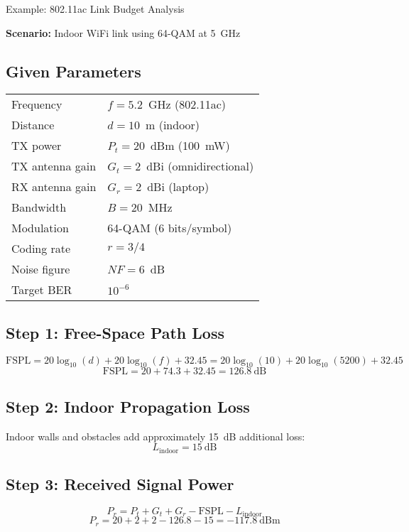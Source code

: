 \begin{calloutbox}{Example: 802.11ac Link Budget Analysis}

\textbf{Scenario:} Indoor WiFi link using 64-QAM at 5~GHz

\subsection*{Given Parameters}
\begin{tabular}{@{}ll@{}}
Frequency & $f = 5.2$~GHz (802.11ac) \\
Distance & $d = 10$~m (indoor) \\
TX power & $P_t = 20$~dBm (100~mW) \\
TX antenna gain & $G_t = 2$~dBi (omnidirectional) \\
RX antenna gain & $G_r = 2$~dBi (laptop) \\
Bandwidth & $B = 20$~MHz \\
Modulation & 64-QAM (6 bits/symbol) \\
Coding rate & $r = 3/4$ \\
Noise figure & $NF = 6$~dB \\
Target BER & $10^{-6}$ \\
\end{tabular}

\subsection*{Step 1: Free-Space Path Loss}
\begin{equation*}
\mathrm{FSPL} = 20\log_{10}(d) + 20\log_{10}(f) + 32.45 = 20\log_{10}(10) + 20\log_{10}(5200) + 32.45
\end{equation*}
\begin{equation*}
\mathrm{FSPL} = 20 + 74.3 + 32.45 = 126.8~\text{dB}
\end{equation*}

\subsection*{Step 2: Indoor Propagation Loss}
Indoor walls and obstacles add approximately 15~dB additional loss:
\begin{equation*}
L_{\text{indoor}} = 15~\text{dB}
\end{equation*}

\subsection*{Step 3: Received Signal Power}
\begin{equation*}
P_r = P_t + G_t + G_r - \mathrm{FSPL} - L_{\text{indoor}}
\end{equation*}
\begin{equation*}
P_r = 20 + 2 + 2 - 126.8 - 15 = -117.8~\text{dBm}
\end{equation*}


\end{calloutbox}
